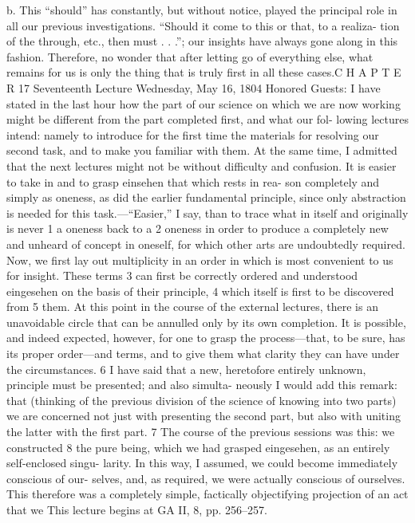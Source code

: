 b. This “should” has constantly, but without notice, played the principal role in
all our previous investigations. “Should it come to this or that, to a realiza-
tion of the through, etc., then must . . .”; our insights have always gone along
in this fashion. Therefore, no wonder that after letting go of everything else,
what remains for us is only the thing that is truly first in all these cases.C H A P T E R
17
Seventeenth Lecture
Wednesday, May 16, 1804
Honored Guests:
I have stated in the last hour how the part of our science on which we are now
working might be different from the part completed first, and what our fol-
lowing lectures intend: namely to introduce for the first time the materials for
resolving our second task, and to make you familiar with them. At the same
time, I admitted that the next lectures might not be without difficulty and
confusion. It is easier to take in and to grasp {einsehen} that which rests in rea-
son completely and simply as oneness, as did the earlier fundamental principle,
since only abstraction is needed for this task.—“Easier,” I say, than to trace
what in itself and originally is never 1 a oneness back to a 2 oneness in order to
produce a completely new and unheard of concept in oneself, for which other
arts are undoubtedly required. Now, we first lay out multiplicity in an order in
which is most convenient to us for insight. These terms 3 can first be correctly
ordered and understood {eingesehen} on the basis of their principle, 4 which itself
is first to be discovered from 5 them. At this point in the course of the external
lectures, there is an unavoidable circle that can be annulled only by its own
completion. It is possible, and indeed expected, however, for one to grasp the
process—that, to be sure, has its proper order—and terms, and to give them
what clarity they can have under the circumstances. 6 I have said that a new,
heretofore entirely unknown, principle must be presented; and also simulta-
neously I would add this remark: that (thinking of the previous division of the
science of knowing into two parts) we are concerned not just with presenting
the second part, but also with uniting the latter with the first part. 7
The course of the previous sessions was this: we constructed 8 the pure
being, which we had grasped {eingesehen}, as an entirely self-enclosed singu-
larity. In this way, I assumed, we could become immediately conscious of our-
selves, and, as required, we were actually conscious of ourselves. This therefore
was a completely simple, factically objectifying projection of an act that we
This lecture begins at GA II, 8, pp. 256–257.

